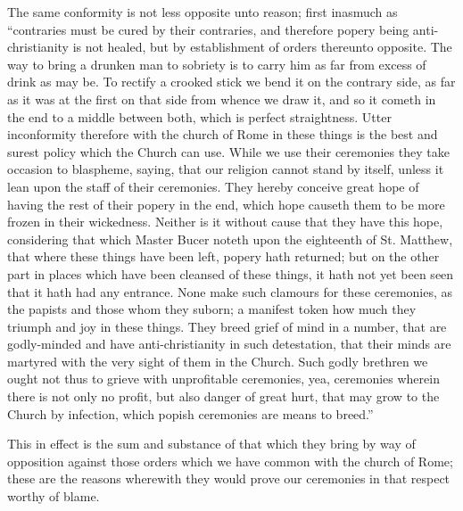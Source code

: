 The same conformity is not less opposite unto reason; first inasmuch as “contraries must be cured by their contraries, and therefore popery being anti-christianity is not healed, but by establishment of orders thereunto opposite. The way to bring a drunken man to sobriety is to carry him as far from excess of drink as may be. To rectify a crooked  stick we bend it on the contrary side, as far as it was at the first on that side from whence we draw it, and so it cometh in the end to a middle between both, which is perfect straightness. Utter inconformity therefore with the church of Rome in these things is the best and surest policy which the Church can use. While we use their ceremonies they take occasion to blaspheme, saying, that our religion cannot stand by itself, unless it lean upon the staff of their ceremonies. They hereby conceive great hope of having the rest of their popery in the end, which hope causeth them to be more frozen in their wickedness. Neither is it without cause that they have this hope, considering that which Master Bucer noteth upon the eighteenth of St. Matthew, that where these things have been left, popery hath returned; but on the other part in places which have been cleansed of these things, it hath not yet been seen that it hath had any entrance. None make such clamours for these ceremonies, as the papists and those whom they suborn; a manifest token how much they triumph and joy in these things. They breed grief of mind in a number, that are godly-minded and have anti-christianity in such detestation, that their minds are martyred with the very sight of them in the Church. Such godly brethren we ought not thus to grieve with unprofitable ceremonies, yea, ceremonies wherein there is not only no profit, but also danger of great hurt, that may grow to the Church by infection, which popish ceremonies are means to breed.”

This in effect is the sum and substance of that which they bring by way of opposition against those orders which we have common with the church of Rome; these are the reasons wherewith they would prove our ceremonies in that respect worthy of blame.

